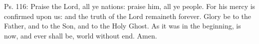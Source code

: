 \documentclass[11pt]{article}
\begin{document}





\begin{otherlanguage}{english}\noindent Ps. 116: Praise the Lord, all ye nations: praise him, all ye people. For his mercy is confirmed upon us: and the truth of the Lord remaineth forever. Glory be to the Father, and to the Son, and to the Holy Ghost. As it was in the beginning, is now, and ever shall be, world without end. Amen.\end{otherlanguage}
\end{document}
